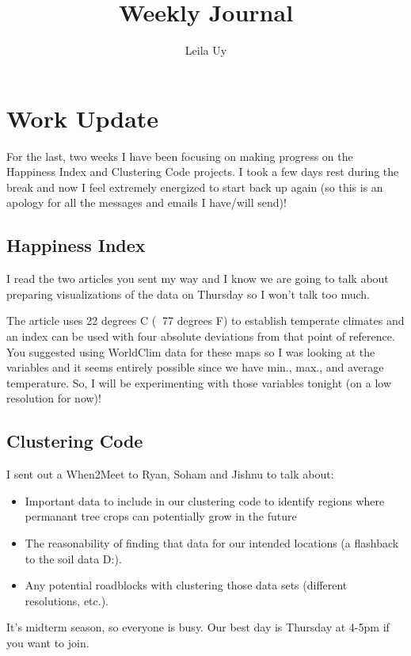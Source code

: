 \documentclass[a4paper,10pt]{article}
\title{Weekly Journal}
\author{Leila Uy}
\begin{document}
\maketitle

% 

\section{Work Update}
For the last, two weeks I have been focusing on making progress on the Happiness Index and Clustering Code projects. I took a few days rest during the break and now I feel extremely energized to start back up again (so this is an apology for all the messages and emails I have/will send)!

\subsection{Happiness Index}
I read the two articles you sent my way and I know we are going to talk about preparing visualizations of the data on Thursday so I won't talk too much. 

The article uses 22 degrees C ($~$ 77 degrees F) to establish temperate climates and an index can be used with four absolute deviations from that point of reference. You suggested using WorldClim data for these maps so I was looking at the variables and it seems entirely possible since we have min., max., and average temperature. So, I will be experimenting with those variables tonight (on a low resolution for now)! 

\subsection{Clustering Code}
I sent out a When2Meet to Ryan, Soham and Jishnu to talk about:
\begin{itemize}
    \item Important data to include in our clustering code to identify regions where permanant tree crops can potentially grow in the future
    \item The reasonability of finding that data for our intended locations (a flashback to the soil data D:).
    \item Any potential roadblocks with clustering those data sets (different resolutions, etc.).
\end{itemize}
It's midterm season, so everyone is busy. Our best day is Thursday at 4-5pm if you want to join.
\end{document}
